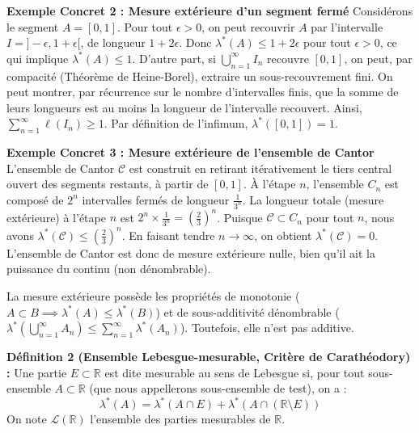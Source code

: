 \documentclass[11pt,a4paper]{article}
\begin{document}
\textbf{Exemple Concret 2 : Mesure extérieure d'un segment fermé}
Considérons le segment $A = [0, 1]$.
Pour tout $\epsilon > 0$, on peut recouvrir $A$ par l'intervalle $I = ]-\epsilon, 1+\epsilon[$, de longueur $1+2\epsilon$.
Donc $\lambda^*(A) \le 1+2\epsilon$ pour tout $\epsilon > 0$, ce qui implique $\lambda^*(A) \le 1$.
D'autre part, si $\bigcup_{n=1}^\infty I_n$ recouvre $[0, 1]$, on peut, par compacité (Théorème de Heine-Borel), extraire un sous-recouvrement fini. On peut montrer, par récurrence sur le nombre d'intervalles finis, que la somme de leurs longueurs est au moins la longueur de l'intervalle recouvert. Ainsi, $\sum_{n=1}^\infty \ell(I_n) \ge 1$.
Par définition de l'infimum, $\lambda^*([0, 1]) = 1$.

\textbf{Exemple Concret 3 : Mesure extérieure de l'ensemble de Cantor}
L'ensemble de Cantor $\mathcal{C}$ est construit en retirant itérativement le tiers central ouvert des segments restants, à partir de $[0, 1]$.
À l'étape $n$, l'ensemble $C_n$ est composé de $2^n$ intervalles fermés de longueur $\frac{1}{3^n}$.
La longueur totale (mesure extérieure) à l'étape $n$ est $2^n \times \frac{1}{3^n} = \left(\frac{2}{3}\right)^n$.
Puisque $\mathcal{C} \subset C_n$ pour tout $n$, nous avons $\lambda^*(\mathcal{C}) \le \left(\frac{2}{3}\right)^n$.
En faisant tendre $n \to \infty$, on obtient $\lambda^*(\mathcal{C}) = 0$. L'ensemble de Cantor est donc de mesure extérieure nulle, bien qu'il ait la puissance du continu (non dénombrable).

La mesure extérieure possède les propriétés de monotonie ($A \subset B \implies \lambda^*(A) \le \lambda^*(B)$) et de sous-additivité dénombrable ($\lambda^*\left(\bigcup_{n=1}^\infty A_n\right) \le \sum_{n=1}^\infty \lambda^*(A_n)$). Toutefois, elle n'est pas additive.

\textbf{Définition 2 (Ensemble Lebesgue-mesurable, Critère de Carathéodory) :}
Une partie $E \subset \mathbb{R}$ est dite mesurable au sens de Lebesgue si, pour tout sous-ensemble $A \subset \mathbb{R}$ (que nous appellerons sous-ensemble de test), on a :
$$\lambda^*(A) = \lambda^*(A \cap E) + \lambda^*(A \cap (\mathbb{R} \setminus E))$$
On note $\mathcal{L}(\mathbb{R})$ l'ensemble des parties mesurables de $\mathbb{R}$.

\end{document}
